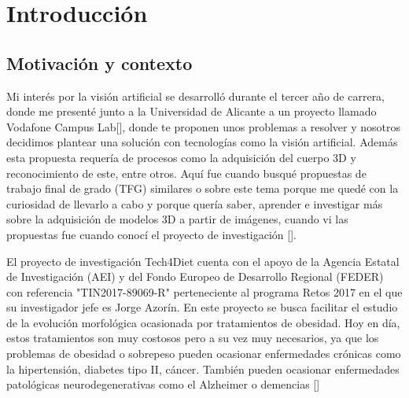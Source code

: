 
\chapter{Introducción}

\section{Motivación y contexto}


Mi interés por la visión artificial se desarrolló durante el tercer año de carrera, donde me presenté junto a la Universidad de Alicante a un proyecto llamado Vodafone Campus Lab[\cite{Vodafone}], donde te proponen unos problemas a resolver y nosotros decidimos plantear una solución con tecnologías como la visión artificial. Además esta propuesta requería de procesos como la adquisición del cuerpo 3D y reconocimiento de este, entre otros. Aquí fue cuando busqué propuestas de trabajo final de grado (TFG) similares o sobre este tema porque me quedé con la curiosidad de llevarlo a cabo y porque quería saber, aprender e investigar más sobre la adquisición de modelos 3D a partir de imágenes, cuando vi las propuestas fue cuando conocí el proyecto de investigación [\cite{tech}].

El proyecto de investigación Tech4Diet cuenta con el apoyo de la Agencia Estatal de Investigación (AEI) y del Fondo Europeo de Desarrollo Regional (FEDER) con referencia "TIN2017-89069-R" perteneciente al programa Retos 2017 en el que su investigador jefe es Jorge Azorín. En este proyecto se busca facilitar el estudio de la evolución morfológica ocasionada por tratamientos de obesidad. Hoy en día, estos tratamientos son muy costosos pero a su vez muy necesarios, ya que los problemas de obesidad o sobrepeso pueden ocasionar enfermedades crónicas como la hipertensión, diabetes tipo II, cáncer. También pueden ocasionar enfermedades patológicas neurodegenerativas como el Alzheimer o demencias [\cite{Andres1}]


